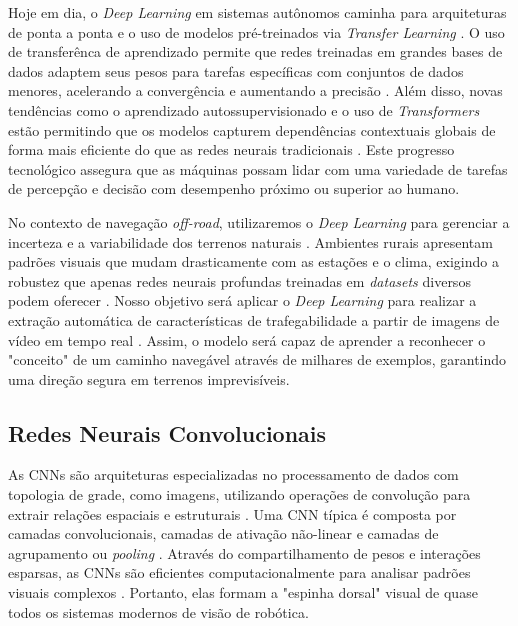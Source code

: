 \documentclass[a4paper,10pt, twocolumn]{article}
\begin{document}
Hoje em dia, o \textit{Deep Learning} em sistemas autônomos caminha para arquiteturas de ponta a ponta e o uso de modelos
pré-treinados via \textit{Transfer Learning} \cite{10.1145/3729420, s19112577}. O uso de transferênca de aprendizado 
permite que redes treinadas em grandes bases de dados adaptem seus pesos para tarefas específicas com conjuntos de dados menores, 
acelerando a convergência e aumentando
a precisão \cite{GARCIAGARCIA201841, s19112577}. Além disso, novas tendências como o aprendizado 
autossupervisionado e o uso de \textit{Transformers} estão permitindo que os
modelos capturem dependências contextuais globais de forma mais eficiente do que as redes neurais 
tradicionais \cite{10.1145/3729420, s26061944}. Este progresso
tecnológico assegura que as máquinas possam lidar com uma variedade de tarefas de percepção e decisão com desempenho próximo ou
superior ao humano.

No contexto de navegação \textit{off-road}, utilizaremos o \textit{Deep Learning} para gerenciar a incerteza e a variabilidade dos
terrenos naturais \cite{10742323, s26061944}. Ambientes rurais apresentam padrões visuais que mudam drasticamente 
com as estações e o clima, exigindo a
robustez que apenas redes neurais profundas treinadas em \textit{datasets} diversos podem oferecer \cite{KABIR2025102644, 10742323}. Nosso 
objetivo será aplicar o \textit{Deep Learning}
para realizar a extração automática de características de trafegabilidade a partir de imagens de vídeo em 
tempo real \cite{10742323, Sehar2022}. Assim, o modelo
será capaz de aprender a reconhecer o "conceito" de um caminho navegável através de milhares de exemplos, garantindo uma direção segura
em terrenos imprevisíveis.

\subsection{Redes Neurais Convolucionais}

As CNNs são arquiteturas especializadas no processamento de dados com topologia de grade,
como imagens, utilizando operações de convolução para extrair relações espaciais e estruturais \cite{s19112577}. Uma CNN 
típica é composta por
camadas convolucionais, camadas de ativação não-linear e
camadas de agrupamento ou \textit{pooling} \cite{s19112577, GARCIAGARCIA201841}.
Através do compartilhamento de pesos e interações esparsas, as CNNs são eficientes computacionalmente para analisar padrões visuais
complexos \cite{s19112577}. Portanto, elas formam a "espinha dorsal" visual de quase todos os sistemas modernos de visão de robótica.
\end{document}

